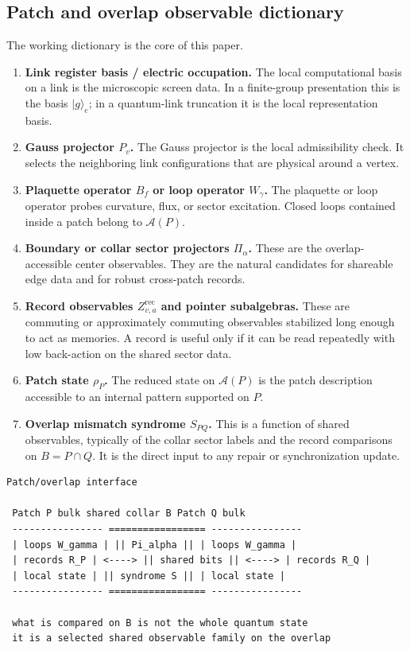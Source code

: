 \documentclass[11pt]{article}
\begin{document}
\subsection{Patch and overlap observable dictionary}

The working dictionary is the core of this paper.

\begin{enumerate}[leftmargin=2em]
\item \textbf{Link register basis / electric occupation.}
The local computational basis on a link is the microscopic screen data. In a finite-group
presentation this is the basis $|g\rangle_e$; in a quantum-link truncation it is the local
representation basis.

\item \textbf{Gauss projector $P_v$.}
The Gauss projector is the local admissibility check. It selects the neighboring link
configurations that are physical around a vertex.

\item \textbf{Plaquette operator $B_f$ or loop operator $W_\gamma$.}
The plaquette or loop operator probes curvature, flux, or sector excitation. Closed loops
contained inside a patch belong to $\mathcal A(P)$.

\item \textbf{Boundary or collar sector projectors $\Pi_{\alpha}$.}
These are the overlap-accessible center observables. They are the natural candidates for
shareable edge data and for robust cross-patch records.

\item \textbf{Record observables $Z^{\mathrm{rec}}_{v,a}$ and pointer subalgebras.}
These are commuting or approximately commuting observables stabilized long enough to act as
memories. A record is useful only if it can be read repeatedly with low back-action on the
shared sector data.

\item \textbf{Patch state $\rho_P$.}
The reduced state on $\mathcal A(P)$ is the patch description accessible to an internal
pattern supported on $P$.

\item \textbf{Overlap mismatch syndrome $S_{PQ}$.}
This is a function of shared observables, typically of the collar sector labels and the record
comparisons on $B=P\cap Q$. It is the direct input to any repair or synchronization update.
\end{enumerate}

\begin{verbatim}
Patch/overlap interface

 Patch P bulk shared collar B Patch Q bulk
 ---------------- ================= ----------------
 | loops W_gamma | || Pi_alpha || | loops W_gamma |
 | records R_P | <----> || shared bits || <----> | records R_Q |
 | local state | || syndrome S || | local state |
 ---------------- ================= ----------------

 what is compared on B is not the whole quantum state
 it is a selected shared observable family on the overlap
\end{verbatim}
\end{document}
